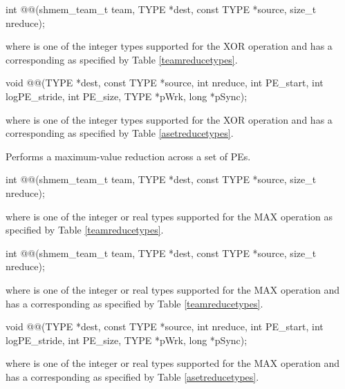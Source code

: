 \begin{apidefinition}
\begin{Csynopsis}
\end{Csynopsis}
\begin{CsynopsisCol}
int @@(shmem_team_t team, TYPE *dest, const TYPE *source, size_t nreduce);
\end{CsynopsisCol}
where \TYPE{} is one of the integer types supported for the XOR operation and has a corresponding \TYPENAME{} as specified by Table \ref{teamreducetypes}.

\begin{DeprecateBlock}
\begin{CsynopsisCol}
void @@(TYPE *dest, const TYPE *source, int nreduce, int PE_start, int logPE_stride, int PE_size, TYPE *pWrk, long *pSync);
\end{CsynopsisCol}
\end{DeprecateBlock}
where \TYPE{} is one of the integer types supported for the XOR operation and has a corresponding \TYPENAME{} as specified by Table \ref{asetreducetypes}.

\label{subsec:shmem_max_reduce}
Performs a maximum-value reduction across a set of \acp{PE}.\newline

\begin{C11synopsis}
int @@(shmem_team_t team, TYPE *dest, const TYPE *source, size_t nreduce);
\end{C11synopsis}
where \TYPE{} is one of the integer or real types supported for the MAX operation as specified by Table \ref{teamreducetypes}.

\begin{Csynopsis}
\end{Csynopsis}

\begin{CsynopsisCol}
int @@(shmem_team_t team, TYPE *dest, const TYPE *source, size_t nreduce);
\end{CsynopsisCol}
where \TYPE{} is one of the integer or real types supported for the MAX operation and has a corresponding \TYPENAME{} as specified by Table \ref{teamreducetypes}.

\begin{DeprecateBlock}
\begin{CsynopsisCol}
void @@(TYPE *dest, const TYPE *source, int nreduce, int PE_start, int logPE_stride, int PE_size, TYPE *pWrk, long *pSync);
\end{CsynopsisCol}
\end{DeprecateBlock}
where \TYPE{} is one of the integer or real types supported for the MAX operation and has a corresponding \TYPENAME{} as specified by Table \ref{asetreducetypes}.


\end{apidefinition}
